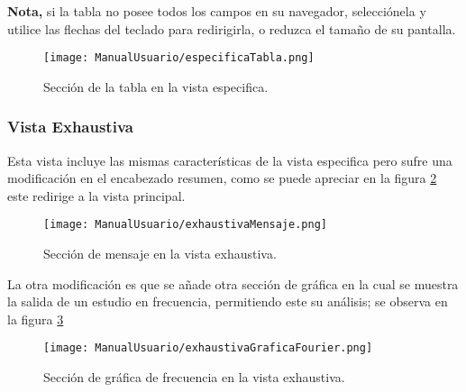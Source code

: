 \textbf{Nota,} si la tabla no posee todos los campos en su navegador, selecciónela
y utilice las flechas del teclado para redirigirla, o reduzca el tamaño de su
pantalla.

    \begin{figure}[H]
		\centering
        \caption{Sección de la tabla en la vista especifica. }
        \texttt{[image: ManualUsuario/especificaTabla.png]}
        \label{img:especificaTablaManual}
	\end{figure}


\subsubsection{Vista Exhaustiva}
Esta vista incluye las mismas características de la vista especifica pero sufre
una modificación en el encabezado resumen, como se puede apreciar en la figura
\ref{img:exhaustivaMensajeManual}
este redirige a la vista principal.

    \begin{figure}[H]
		\centering
        \caption{Sección de mensaje en la vista exhaustiva. }
        \texttt{[image: ManualUsuario/exhaustivaMensaje.png]}
        \label{img:exhaustivaMensajeManual}
	\end{figure}



La otra modificación es que se añade otra sección de gráfica en la cual se muestra
la salida de un estudio en frecuencia, permitiendo este su análisis; se observa en
la figura \ref{img:exhaustivaGraficaFourierManual}


    \begin{figure}[H]
		\centering
        \caption{Sección de gráfica de frecuencia en la vista exhaustiva. }
        \texttt{[image: ManualUsuario/exhaustivaGraficaFourier.png]}
        \label{img:exhaustivaGraficaFourierManual}
	\end{figure}




